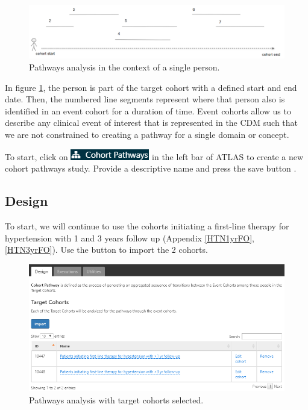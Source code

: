 \documentclass[11pt]{book}
\theoremstyle{definition}
\theoremstyle{definition}
\theoremstyle{definition}
\theoremstyle{remark}
\begin{document}
\begin{figure}

{\centering \includegraphics[width=1\linewidth]{images/Characterization/pathwaysPersonEventView} 

}

\caption{Pathways analysis in the context of a single person.}\label{fig:pathwaysPersonEventView}
\end{figure}

In figure \ref{fig:pathwaysPersonEventView}, the person is part of the target cohort with a defined start and end date. Then, the numbered line segments represent where that person also is identified in an event cohort for a duration of time. Event cohorts allow us to describe any clinical event of interest that is represented in the CDM such that we are not constrained to creating a pathway for a single domain or concept.

To start, click on \includegraphics{images/Characterization/atlasPathwaysMenuItem.png} in the left bar of ATLAS to create a new cohort pathways study. Provide a descriptive name and press the save button .

\hypertarget{design-1}{%
\subsection{Design}\label{design-1}}

To start, we will continue to use the cohorts initiating a first-line therapy for hypertension with 1 and 3 years follow up (Appendix \ref{HTN1yrFO}, \ref{HTN3yrFO}). Use the button to import the 2 cohorts.

\begin{figure}

{\centering \includegraphics[width=1\linewidth]{images/Characterization/atlasPathwaysTargetCohorts} 

}

\caption{Pathways analysis with target cohorts selected.}\label{fig:atlasPathwaysTargetCohorts}
\end{figure}
\end{document}
